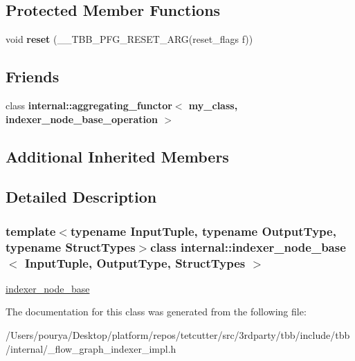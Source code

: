 \subsection*{Protected Member Functions}
\begin{DoxyCompactItemize}
\item 
\hypertarget{classinternal_1_1indexer__node__base_a217e47f48fdf607efa9d564830b0a77c}{}void {\bfseries reset} (\+\_\+\+\_\+\+T\+B\+B\+\_\+\+P\+F\+G\+\_\+\+R\+E\+S\+E\+T\+\_\+\+A\+R\+G(reset\+\_\+flags f))\label{classinternal_1_1indexer__node__base_a217e47f48fdf607efa9d564830b0a77c}

\end{DoxyCompactItemize}
\subsection*{Friends}
\begin{DoxyCompactItemize}
\item 
\hypertarget{classinternal_1_1indexer__node__base_ab0e08e0b59a5d5e7a3f53169f159a68b}{}class {\bfseries internal\+::aggregating\+\_\+functor$<$ my\+\_\+class, indexer\+\_\+node\+\_\+base\+\_\+operation $>$}\label{classinternal_1_1indexer__node__base_ab0e08e0b59a5d5e7a3f53169f159a68b}

\end{DoxyCompactItemize}
\subsection*{Additional Inherited Members}


\subsection{Detailed Description}
\subsubsection*{template$<$typename Input\+Tuple, typename Output\+Type, typename Struct\+Types$>$class internal\+::indexer\+\_\+node\+\_\+base$<$ Input\+Tuple, Output\+Type, Struct\+Types $>$}

\hyperlink{classinternal_1_1indexer__node__base}{indexer\+\_\+node\+\_\+base} 

The documentation for this class was generated from the following file\+:\begin{DoxyCompactItemize}
\item 
/\+Users/pourya/\+Desktop/platform/repos/tetcutter/src/3rdparty/tbb/include/tbb/internal/\+\_\+flow\+\_\+graph\+\_\+indexer\+\_\+impl.\+h\end{DoxyCompactItemize}
